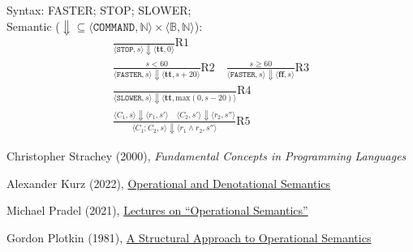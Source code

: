 \documentclass{article}
\begin{document}
Syntax: {\ttfamily FASTER; STOP; SLOWER;}\\
Semantic ($\bm{\Downarrow} \subseteq \langle \texttt{COMMAND}, \mathbb{N} \rangle \times \langle \mathbb{B}, \mathbb{N} \rangle$):
\begin{gather*}
\frac
  {}
  {\langle \texttt{STOP}, s \rangle \Downarrow \langle \textbf{tt}, 0 \rangle }
  \text{R1}
\\[24pt]
\frac
  { s < 60 }
  {\langle \texttt{FASTER}, s \rangle \Downarrow \langle \textbf{tt}, s + 20 \rangle }
  \text{R2}
\quad
\frac
  { s \geq 60 }
  {\langle \texttt{FASTER}, s \rangle \Downarrow \langle \textbf{ff}, s \rangle }
  \text{R3}
\\[24pt]
\frac
  {}
  {\langle \texttt{SLOWER}, s \rangle \Downarrow \langle \textbf{tt}, \text{max}(0, s - 20) \rangle }
  \text{R4}
\\[24pt]
\frac
  {\langle C_1, s \rangle \Downarrow \langle r_1, s' \rangle \quad \langle C_2, s' \rangle \Downarrow \langle r_2, s'' \rangle }
  {\langle C_1 ; C_2, s \rangle \Downarrow \langle r_1 \wedge r_2, s'' \rangle }
  \text{R5}
\end{gather*}
\plush{}


\begin{prooftree}
\end{prooftree}
\plush{}


\plush{}


Christopher Strachey (2000),
\emph{Fundamental Concepts in Programming Languages}

Alexander Kurz (2022),
\href{https://hackmd.io/@alexhkurz/Hkf6BTL6P}{Operational and Denotational Semantics}

Michael Pradel (2021),
\href{https://www.youtube.com/watch?v=jsBHd3-04oA}{Lectures on ``Operational Semantics''}

Gordon Plotkin (1981),
\href{https://web.eecs.umich.edu/~weimerw/2006-615/reading/plotkin81structural.pdf}{A Structural Approach to Operational Semantics}
\end{document}
